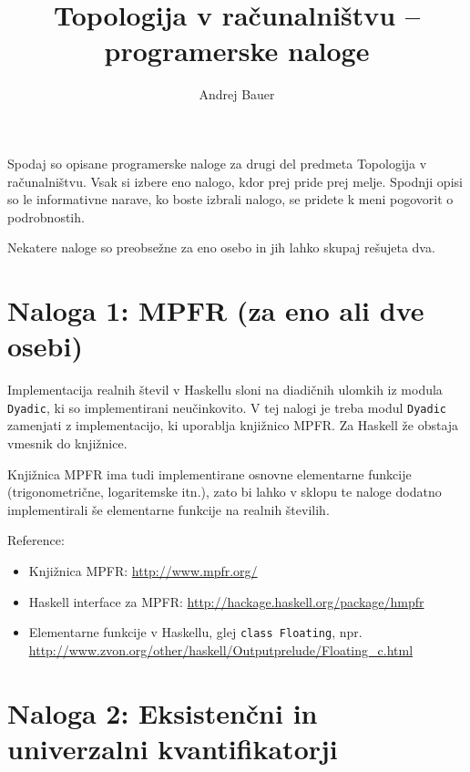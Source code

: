 \documentclass[a4paper]{article}
\begin{document}
\title{Topologija v računalništvu -- programerske naloge}
\author{Andrej Bauer}

\maketitle

Spodaj so opisane programerske naloge za drugi del predmeta Topologija
v računalništvu. Vsak si izbere eno nalogo, kdor prej pride prej
melje. Spodnji opisi so le informativne narave, ko boste izbrali
nalogo, se pridete k meni pogovorit o podrobnostih.

Nekatere naloge so preobsežne za eno osebo in jih lahko skupaj
rešujeta dva.

\section*{Naloga 1: MPFR (za eno ali dve osebi)}

Implementacija realnih števil v Haskellu sloni na diadičnih ulomkih iz
modula \texttt{Dyadic}, ki so implementirani neučinkovito. V tej
nalogi je treba modul \texttt{Dyadic} zamenjati z implementacijo, ki
uporablja knjižnico MPFR. Za Haskell že obstaja vmesnik do knjižnice.

Knjižnica MPFR ima tudi implementirane osnovne elementarne funkcije
(trigonometrične, logaritemske itn.), zato bi lahko v sklopu te naloge
dodatno implementirali še elementarne funkcije na realnih številih.

Reference:
%
\begin{itemize}
\item Knjižnica MPFR: \url{http://www.mpfr.org/}
\item Haskell interface za MPFR: \url{http://hackage.haskell.org/package/hmpfr}
\item Elementarne funkcije v Haskellu, glej \texttt{class Floating},
  npr. \url{http://www.zvon.org/other/haskell/Outputprelude/Floating_c.html}
\end{itemize}


\section*{Naloga 2: Eksistenčni in univerzalni kvantifikatorji}
\end{document}

